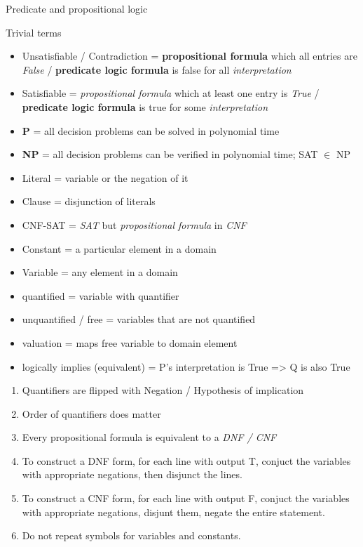 \documentclass{alittlebear}
\begin{document}
\begin{unit}{Predicate and propositional logic}{}
\begin{note}{Trivial terms}
\begin{itemize}
            \item Unsatisfiable / Contradiction = \textbf{propositional formula} which all entries are \textit{False} / \textbf{predicate logic formula} is false for all \textit{interpretation}
            \item Satisfiable = \textit{propositional formula} which at least one entry is \textit{True} / \textbf{predicate logic formula} is true for some \textit{interpretation}\\
            \item \textbf{P} = all decision problems can be solved in polynomial time
            \item \textbf{NP} = all decision problems can be verified in polynomial time; SAT $\in$ NP
            \item Literal = variable or the negation of it
            \item Clause = disjunction of literals
            \item CNF-SAT = \textit{SAT} but \textit{propositional formula} in \textit{CNF}\\
            \item Constant = a particular element in a domain
            \item Variable = any element in a domain
            \item quantified = variable with quantifier
            \item unquantified / free = variables that are not quantified
            \item valuation = maps free variable to domain element
            \item logically implies (equivalent) = P's interpretation is True => Q is also True
        \end{itemize}
    \end{note}
    \begin{hint}{\hfill}
        \begin{enumerate}
            \item Quantifiers are flipped with Negation / Hypothesis of implication
            \item Order of quantifiers does matter
            \item Every propositional formula is equivalent to a \textit{DNF / CNF}
            \item To construct a DNF form, for each line with output T, conjuct the variables with appropriate negations, then disjunct the lines.
            \item To construct a CNF form, for each line with output F, conjuct the variables with appropriate negations, disjunt them, negate the entire statement. 
            \item Do not repeat symbols for variables and constants.
        \end{enumerate}
    \end{hint}
\end{unit}
\end{document}
